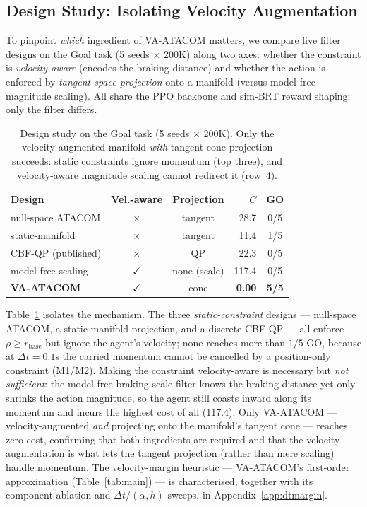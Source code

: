 \documentclass[letterpaper]{article}
\begin{document}


\subsection{Design Study: Isolating Velocity Augmentation}
\label{sec:design-study}

To pinpoint \emph{which} ingredient of VA-ATACOM matters, we compare five filter designs on the Goal task (5 seeds $\times$ 200K) along two axes: whether the constraint is \emph{velocity-aware} (encodes the braking distance) and whether the action is enforced by \emph{tangent-space projection} onto a manifold (versus model-free magnitude scaling). All share the PPO backbone and sim-BRT reward shaping; only the filter differs.

\begin{table}[t]
\centering
\caption{Design study on the Goal task (5 seeds $\times$ 200K). Only the velocity-augmented manifold \emph{with} tangent-cone projection succeeds: static constraints ignore momentum (top three), and velocity-aware magnitude scaling cannot redirect it (row~4).}
\label{tab:design}
\begin{tabular}{lcc r c}
\toprule
Design & Vel.-aware & Projection & $\bar C$ & GO \\
\midrule
null-space ATACOM   & $\times$     & tangent      & 28.7  & 0/5 \\
static-manifold     & $\times$     & tangent      & 11.4  & 1/5 \\
CBF-QP (published)  & $\times$     & QP           & 22.3  & 0/5 \\
model-free scaling  & $\checkmark$ & none (scale) & 117.4 & 0/5 \\
\textbf{VA-ATACOM}  & $\checkmark$ & cone         & \textbf{0.00} & \textbf{5/5} \\
\bottomrule
\end{tabular}
\end{table}

Table~\ref{tab:design} isolates the mechanism. The three \emph{static-constraint} designs --- null-space ATACOM, a static manifold projection, and a discrete CBF-QP --- all enforce $\rho \ge r_\text{base}$ but ignore the agent's velocity; none reaches more than $1/5$ GO, because at $\Delta t{=}0.1$s the carried momentum cannot be cancelled by a position-only constraint (M1/M2). Making the constraint velocity-aware is necessary but \emph{not sufficient}: the model-free braking-scale filter knows the braking distance yet only shrinks the action magnitude, so the agent still coasts inward along its momentum and incurs the highest cost of all (117.4). Only VA-ATACOM --- velocity-augmented \emph{and} projecting onto the manifold's tangent cone --- reaches zero cost, confirming that both ingredients are required and that the velocity augmentation is what lets the tangent projection (rather than mere scaling) handle momentum. The velocity-margin heuristic --- VA-ATACOM's first-order approximation (Table~\ref{tab:main}) --- is characterised, together with its component ablation and $\Delta t$/$(\alpha,h)$ sweeps, in Appendix~\ref{app:dtmargin}.
\end{document}
